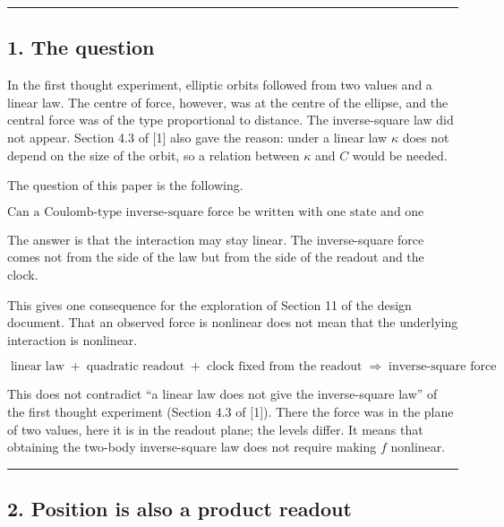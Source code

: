 \documentclass[
  a4paper,
]{article}
\begin{document}
\begin{center}\rule{0.5\linewidth}{0.5pt}\end{center}

\subsection{1. The question}\label{the-question}

In the first thought experiment, elliptic orbits followed from two
values and a linear law. The centre of force, however, was at the centre
of the ellipse, and the central force was of the type proportional to
distance. The inverse-square law did not appear. Section 4.3 of {[}1{]}
also gave the reason: under a linear law \(\kappa\) does not depend on
the size of the orbit, so a relation between \(\kappa\) and \(C\) would
be needed.

The question of this paper is the following.

\[
\boxed{\text{Can a Coulomb-type inverse-square force be written with one state and one relation alone? May the interaction stay linear?}}
\]

The answer is that the interaction may stay linear. The inverse-square
force comes not from the side of the law but from the side of the
readout and the clock.

This gives one consequence for the exploration of Section 11 of the
design document. That an observed force is nonlinear does not mean that
the underlying interaction is nonlinear.

\[
\boxed{\;\text{linear law}\;+\;\text{quadratic readout}\;+\;\text{clock fixed from the readout}\;\Longrightarrow\;\text{inverse-square force}\;}
\]

This does not contradict ``a linear law does not give the inverse-square
law'' of the first thought experiment (Section 4.3 of {[}1{]}). There
the force was in the plane of two values, here it is in the readout
plane; the levels differ. It means that obtaining the two-body
inverse-square law does not require making \(f\) nonlinear.

\begin{center}\rule{0.5\linewidth}{0.5pt}\end{center}

\subsection{2. Position is also a product
readout}\label{position-is-also-a-product-readout}
\end{document}
